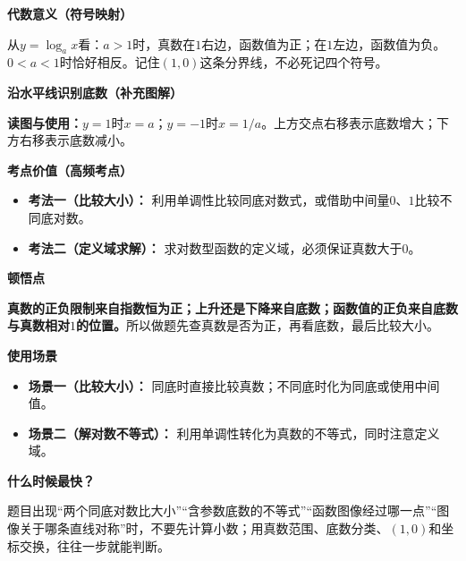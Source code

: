 \clearpage
\begin{explanationbox}
\textbf{\textcolor{CExplanation}{代数意义（符号映射）}}



	从$y=\log_a x$看：$a>1$时，真数在$1$右边，函数值为正；在$1$左边，函数值为负。$0<a<1$时恰好相反。记住$(1,0)$这条分界线，不必死记四个符号。

	\medskip
	
\end{explanationbox}
\clearpage
\begin{explanationbox}
\textbf{\textcolor{CExplanation}{沿水平线识别底数（补充图解）}}

\textbf{读图与使用：}$y=1$时$x=a$；$y=-1$时$x=1/a$。上方交点右移表示底数增大；下方右移表示底数减小。

\textbf{\textcolor{CExplanation}{考点价值（高频考点）}}
	\begin{itemize}[leftmargin=*, itemsep=0.5em, topsep=0.4em]
		\item \textbf{考法一（比较大小）：} 利用单调性比较同底对数式，或借助中间量$0$、$1$比较不同底对数。
		\item \textbf{考法二（定义域求解）：} 求对数型函数的定义域，必须保证真数大于$0$。
	\end{itemize}

	\medskip
	\textbf{\textcolor{CExplanation}{顿悟点}}

\textbf{真数的正负限制来自指数恒为正；上升还是下降来自底数；函数值的正负来自底数与真数相对$1$的位置。}所以做题先查真数是否为正，再看底数，最后比较大小。

	\medskip
	\textbf{\textcolor{CExplanation}{使用场景}}
	\begin{itemize}[leftmargin=*, itemsep=0.5em, topsep=0.4em]
		\item \textbf{场景一（比较大小）：} 同底时直接比较真数；不同底时化为同底或使用中间值。
		\item \textbf{场景二（解对数不等式）：} 利用单调性转化为真数的不等式，同时注意定义域。
\end{itemize}

\medskip
\textbf{\textcolor{CExplanation}{什么时候最快？}}

题目出现“两个同底对数比大小”“含参数底数的不等式”“函数图像经过哪一点”“图像关于哪条直线对称”时，不要先计算小数；用真数范围、底数分类、$(1,0)$和坐标交换，往往一步就能判断。
\end{explanationbox}

